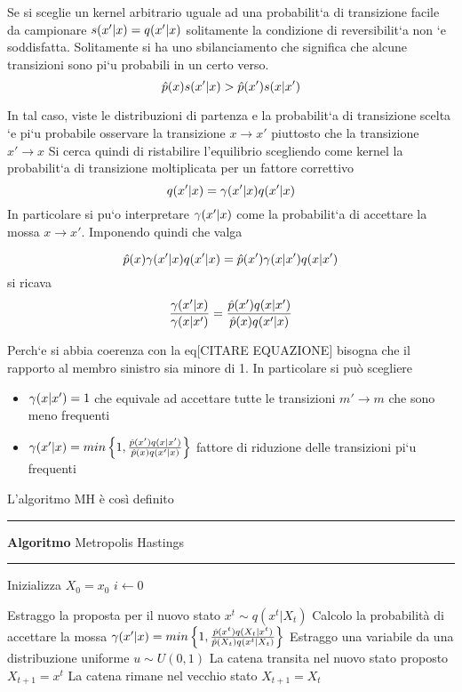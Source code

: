 Se si sceglie un kernel arbitrario uguale ad una probabilit`a di transizione facile
da campionare $s(x'|x) = q(x'|x) $ solitamente la condizione di reversibilit`a non `e
soddisfatta. Solitamente si ha uno sbilanciamento che significa che alcune transizioni
sono pi`u probabili in un certo verso.
\begin{equation}
\hat{p}(x)s(x'|x)>\hat{p}(x')s(x|x')
\end{equation}

In tal caso, viste le distribuzioni di partenza e la probabilit`a di transizione scelta `e
pi`u probabile osservare la transizione $x\rightarrow x'$ piuttosto che la transizione $x'\rightarrow x$
Si cerca quindi di ristabilire l’equilibrio scegliendo come kernel la probabilit`a di
transizione moltiplicata per un fattore correttivo 
\begin{equation}
q(x'|x) = \gamma(x'|x)q(x'|x)
\end{equation}
In particolare si pu`o interpretare $\gamma(x'|x)$ come la probabilit`a di accettare la mossa $x \rightarrow x'$. Imponendo quindi che valga


\begin{equation}
\hat{p}(x)\gamma(x'|x)q(x'|x)=\hat{p}(x')\gamma(x|x')q(x|x')
\end{equation}
si ricava
\begin{equation}
\frac{\gamma(x'|x)}{\gamma(x|x')}=\frac{\hat{p}(x')q(x|x')}{\hat{p}(x)q(x'|x)}
\end{equation}

Perch`e si abbia coerenza con la eq[CITARE EQUAZIONE] bisogna che il rapporto al membro sinistro sia minore di 1. In particolare si può scegliere

\begin{itemize}
\item $\gamma(x|x')=1$ che equivale ad accettare tutte le transizioni $m' \rightarrow m$ che sono meno
frequenti
\item $\gamma(x'|x)=min\left\lbrace 1,\frac{\hat{p}(x')q(x|x')}{\hat{p}(x)q(x'|x)}\right\rbrace$ fattore di riduzione delle transizioni pi`u frequenti
\end{itemize}
 L'algoritmo MH è così definito  \\
\hrule 
\textbf{Algoritmo} Metropolis Hastings
\hrule
\begin{algorithmic}
\State Inizializza  $X_0=x_0$
    \State $i\gets 0$

\State Estraggo la proposta per il nuovo stato $x^t \sim q(x^t |X_t)$
\State Calcolo la probabilità di accettare la mossa $\gamma(x'|x)=min\left\lbrace 1,\frac{\hat{p}(x^t)q(X_t | x^t)}{\hat{p}(X_t)q(x^t|X_t  )}\right\rbrace$
\State Estraggo una variabile da una distribuzione uniforme $u\sim U(0,1)$
 \State La catena transita nel nuovo stato proposto $X_{t+1}=x^t$
\Else
\State La catena rimane nel vecchio stato $X_{t+1}=X_t$
\EndIf
\EndFor
\end{algorithmic}

